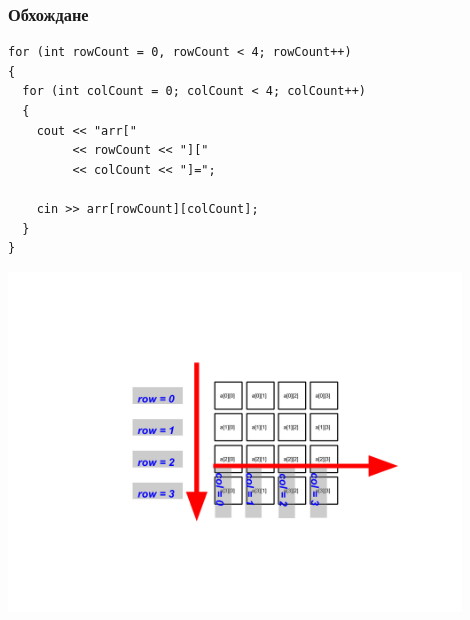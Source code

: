 \documentclass{beamer}
\begin{document}
\begin{frame}[fragile]
\frametitle{Обхождане}

\begin{flushleft}

\begin{lstlisting}
for (int rowCount = 0, rowCount < 4; rowCount++)
{
  for (int colCount = 0; colCount < 4; colCount++)
  {
    cout << "arr["
         << rowCount << "]["
         << colCount << "]="; 
    
    cin >> arr[rowCount][colCount];
  }
}
\end{lstlisting}
\end{flushleft}

\vspace*{-100pt}
\hspace*{-40pt}
\includegraphics[width=12cm]{images/matr_iter_2} 

\end{frame}
\end{document}
